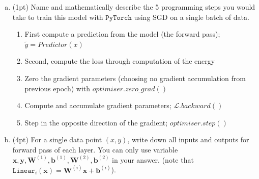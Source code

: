 \documentclass{article}
\newcommand{\cL}{\mathcal{L}}
\begin{document}
\begin{enumerate}[(a)]
  \item
        (1pt) Name and mathematically describe the 5 programming steps you would take to train this model with $\texttt{PyTorch}$ using SGD on a single batch of data.
        \begin{tcolorbox}
          \begin{enumerate}
            \item First compute a prediction from the model (the forward pass);
                  $\tilde{y}=Predictor(x)$
            \item Second, compute the loss through computation of the energy
            \item Zero the gradient parameters (choosing no gradient accumulation from previous
                  epoch) with $optimiser.zero\_grad()$
            \item Compute and accumulate gradient parameters; $\cL.backward()$
            \item Step in the opposite direction of the gradient; $optimiser.step()$
          \end{enumerate}
        \end{tcolorbox}
  \item
        (4pt) For a single data point $(x, y)$, write down all inputs and outputs for forward pass of each layer. You can only use variable $ \bm{x}, \bm{y}, \bm{W}^{(1)}, \bm{b}^{(1)}, \bm{W}^{(2)}, \bm{b}^{(2)}$ in your answer. (note that $\texttt{Linear}_i (\bm{x}) = \bm{W}^{(i)}\bm{x} + \bm{b}^{(i)}$).
        \begin{tcolorbox}


\end{tcolorbox}
\end{enumerate}
\end{document}
